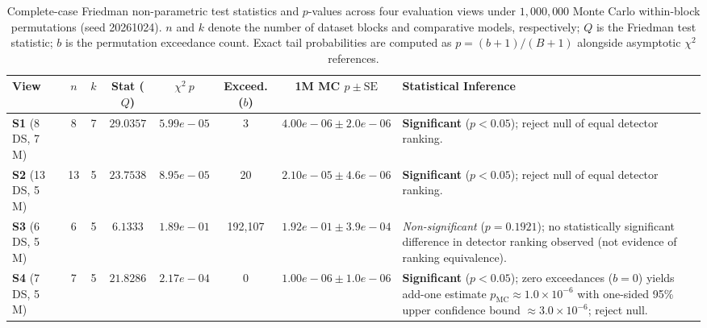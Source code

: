 \documentclass[11pt,a4paper]{article}
\begin{document}
\begin{table}[htbp]
\centering\footnotesize\setlength{\tabcolsep}{2.5pt}
\caption{Complete-case Friedman non-parametric test statistics and $p$-values across four evaluation views under $1{,}000{,}000$ Monte Carlo within-block permutations (seed 20261024). $n$ and $k$ denote the number of dataset blocks and comparative models, respectively; $Q$ is the Friedman test statistic; $b$ is the permutation exceedance count. Exact tail probabilities are computed as $p = (b+1)/(B+1)$ alongside asymptotic $\chi^2$ references.}
\label{tab:friedman_stats}
\begin{tabularx}{\textwidth}{lcccccc>{\raggedright\arraybackslash}X}\toprule
\textbf{View} & \textbf{$n$} & \textbf{$k$} & \textbf{Stat ($Q$)} & $\chi^2\ p$ & \textbf{Exceed. ($b$)} & \textbf{1M MC $p \pm \text{SE}$} & \textbf{Statistical Inference} \\\midrule
\textbf{S1} (8 DS, 7 M) & 8 & 7 & $29.0357$ & $5.99e-05$ & 3 & $4.00e-06 \pm 2.0e-06$ & \textbf{Significant} ($p < 0.05$); reject null of equal detector ranking. \\
\textbf{S2} (13 DS, 5 M) & 13 & 5 & $23.7538$ & $8.95e-05$ & 20 & $2.10e-05 \pm 4.6e-06$ & \textbf{Significant} ($p < 0.05$); reject null of equal detector ranking. \\
\textbf{S3} (6 DS, 5 M) & 6 & 5 & $6.1333$ & $1.89e-01$ & 192,107 & $1.92e-01 \pm 3.9e-04$ & \textit{Non-significant} ($p = 0.1921$); no statistically significant difference in detector ranking observed (not evidence of ranking equivalence). \\
\textbf{S4} (7 DS, 5 M) & 7 & 5 & $21.8286$ & $2.17e-04$ & 0 & $1.00e-06 \pm 1.0e-06$ & \textbf{Significant} ($p < 0.05$); zero exceedances ($b=0$) yields add-one estimate $p_{\mathrm{MC}} \approx 1.0 \times 10^{-6}$ with one-sided 95\% upper confidence bound $\approx 3.0 \times 10^{-6}$; reject null. \\
\bottomrule
\end{tabularx}
\end{table}
\end{document}
